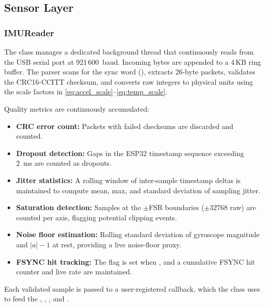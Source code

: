\subsection{Sensor Layer}

\subsubsection{IMUReader}
The  class manages a dedicated background thread that continuously reads from the USB serial port at 921\,600~baud.
Incoming bytes are appended to a 4\,KB ring buffer.
The parser scans for the sync word (), extracts 26-byte packets, validates the CRC16-CCITT checksum, and converts raw integers to physical units using the scale factors in \cref{eq:accel_scale}--\cref{eq:temp_scale}.

Quality metrics are continuously accumulated:
\begin{itemize}[nosep]
  \item \textbf{CRC error count:} Packets with failed checksums are discarded and counted.
  \item \textbf{Dropout detection:} Gaps in the ESP32 timestamp sequence exceeding \SI{2}{\milli\second} are counted as dropouts.
  \item \textbf{Jitter statistics:} A rolling window of inter-sample timestamp deltas is maintained to compute mean, max, and standard deviation of sampling jitter.
  \item \textbf{Saturation detection:} Samples at the $\pm$FSR boundaries ($\pm 32768$ raw) are counted per axis, flagging potential clipping events.
  \item \textbf{Noise floor estimation:} Rolling standard deviation of gyroscope magnitude and $|a| - 1$ at rest, providing a live noise-floor proxy.
  \item \textbf{FSYNC hit tracking:} The  flag is set when , and a cumulative FSYNC hit counter and live rate are maintained.
\end{itemize}

Each validated sample is passed to a user-registered callback, which the  class uses to feed the , , , and .

